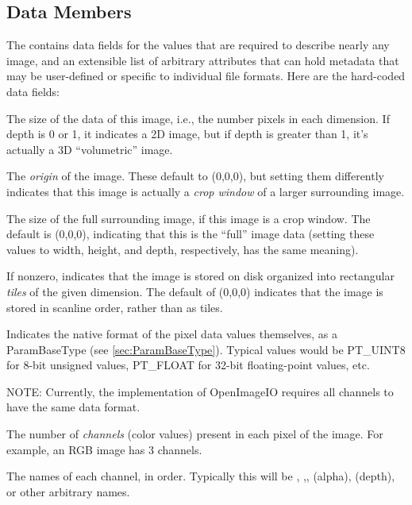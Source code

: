 \subsection{\ImageSpec Data Members}

The \ImageSpec contains data fields for the values that are
required to describe nearly any image, and an extensible list of
arbitrary attributes that can hold metadata that may be user-defined or
specific to individual file formats.  Here are the hard-coded data
fields:

The size of the data of this image, i.e., the number pixels in each
dimension.  If {\kw depth} is 0 or 1, it indicates a 2D image, but if
{\kw depth} is greater than 1, it's actually a 3D ``volumetric'' image.
\apiend

The \emph{origin} of the image.  These default to (0,0,0), but setting
them differently indicates that this image is actually a \emph{crop window}
of a larger surrounding image.
\apiend

The size of the full surrounding image, if this image is a crop window.
The default is (0,0,0), indicating that this is the ``full'' image data
(setting these values to {\kw width}, {\kw height}, and {\kw depth},
respectively, has the same meaning).
\apiend

If nonzero, indicates that the image is stored on disk organized into
rectangular \emph{tiles} of the given dimension.  The default of 
(0,0,0) indicates that the image is stored in scanline order, rather
than as tiles.
\apiend

Indicates the native format of the pixel data values themselves, as a 
{\kw ParamBaseType} (see \ref{sec:ParamBaseType}).  Typical values would be
{\kw PT_UINT8} for 8-bit unsigned values, {\kw PT_FLOAT} for 32-bit
floating-point values, etc.

\noindent NOTE: Currently, the implementation of OpenImageIO requires
all channels to have the same data format.
\apiend

The number of \emph{channels} (color values) present in each pixel of
the image.  For example, an RGB image has 3 channels.
\apiend

The names of each channel, in order.  Typically this will be ,
,,  (alpha),  (depth), or other arbitrary
names.
\apiend

